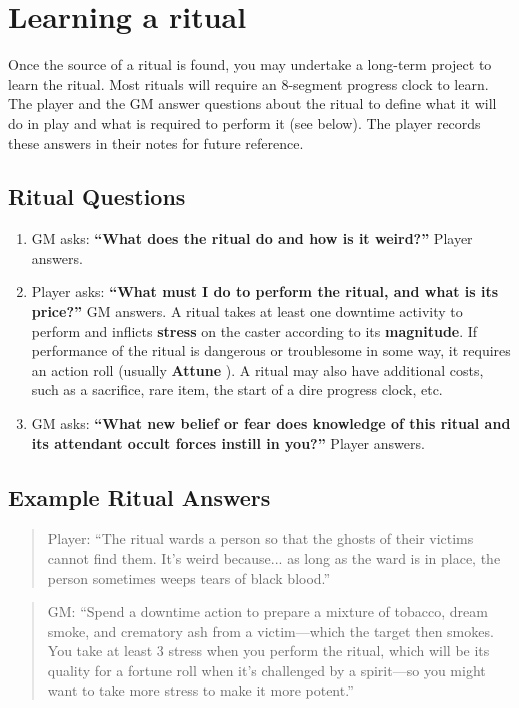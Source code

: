 \documentclass[11pt,oneside]{book}
\newcommand{\gameterm}[1]{\textbf{#1}}
\begin{document}
\section{Learning a ritual}

Once the source of a ritual is found, you may undertake a long-term project to learn the ritual. Most rituals will require an 8-segment progress clock to learn. The player and the GM answer questions about the ritual to define what it will do in play and what is required to perform it (see below). The player records these answers in their notes for future reference.

\subsection{Ritual Questions}
\begin{enumerate}
	\item GM asks: \textbf{“What does the ritual do and how is it weird?”} Player answers.
	\item Player asks: \textbf{“What must I do to perform the ritual, and what is its price?” }GM answers. A ritual takes at least one downtime activity to perform and inflicts \textbf{stress} on the caster according to its \textbf{magnitude}.  If performance of the ritual is dangerous or troublesome in some way, it requires an action roll (usually \gameterm{Attune} ). A ritual may also have additional costs, such as a sacrifice, rare item, the start of a dire progress clock, etc.
	\item GM asks: \textbf{“What new belief or fear does knowledge of this ritual and its attendant occult forces instill in you?”} Player answers.
\end{enumerate}

\subsection{Example Ritual Answers}

\begin{quote}
	Player: “The ritual wards a person so that the ghosts of their victims cannot find them. It’s weird because... as long as the ward is in place, the person sometimes weeps tears of black blood.”
\end{quote} 

\begin{quote}
	GM: “Spend a downtime action to prepare a mixture of tobacco, dream smoke, and crematory ash from a victim---which the target then smokes. You take at least 3 stress when you perform the ritual, which will be its quality for a fortune roll when it’s challenged by a spirit---so you might want to take more stress to make it more potent.”
\end{quote} 
\end{document}
